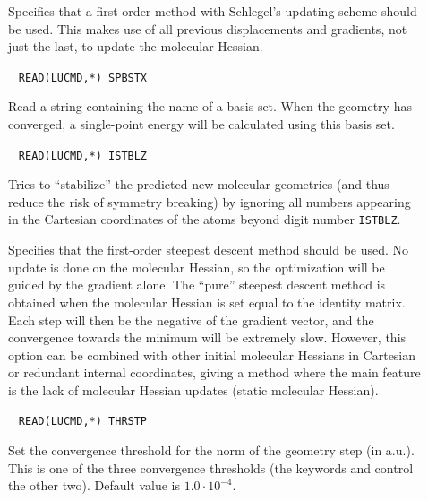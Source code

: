 \begin{description}
\item[]
Specifies that a first-order method
with Schlegel's updating scheme
\cite{Schlegel} should be used. This makes use of all previous
displacements and gradients, not just the last, to update the
molecular Hessian.

\item[]\verb| |
\newline
\verb|READ(LUCMD,*) SPBSTX|

Read a string containing the name of a basis set. When the geometry
has converged, a single-point energy will be calculated using this
basis set.

\item[]\verb| |
\newline
\verb|READ(LUCMD,*) ISTBLZ|

Tries to ``stabilize'' the predicted new molecular geometries (and
thus reduce the risk of symmetry breaking) by ignoring all numbers
appearing in the Cartesian coordinates of the atoms beyond digit
number \verb|ISTBLZ|.

\item[]
Specifies that the first-order steepest descent
 method should be used.
No update is done on the molecular Hessian, so the optimization will be
guided by the gradient alone. The ``pure'' steepest descent method is
obtained when the molecular Hessian is set equal to the identity matrix. Each
step will then be the negative of the gradient vector, and the
convergence towards the minimum will be extremely slow. However, this
option can be combined with other initial molecular Hessians in Cartesian or
redundant internal coordinates,
giving a method where the main feature is the lack of molecular Hessian updates (static molecular Hessian).

\item[]\verb| |
\newline
\verb|READ(LUCMD,*) THRSTP|

Set the convergence threshold for
the norm of the geometry step (in a.u.).
This is one of the three convergence thresholds (the keywords  and
 control the other two). Default value is $1.0\cdot
10^{-4}$.


\end{description}
